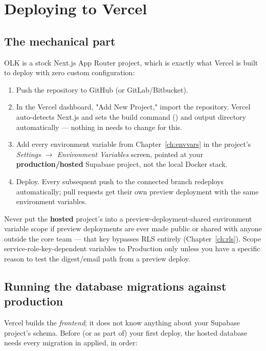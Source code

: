 \chapter{Deploying to Vercel}
\label{ch:vercel}

\section{The mechanical part}

OLK is a stock Next.js App Router project, which is exactly what Vercel is built to deploy with zero custom configuration:

\begin{enumerate}
  \item Push the repository to GitHub (or GitLab/Bitbucket).
  \item In the Vercel dashboard, "Add New Project," import the repository. Vercel auto-detects Next.js and sets the build command () and output directory automatically — nothing in  needs to change for this.
  \item Add every environment variable from Chapter~\ref{ch:envvars} in the project's \emph{Settings $\to$ Environment Variables} screen, pointed at your \textbf{production/hosted} Supabase project, not the local Docker stack.
  \item Deploy. Every subsequent push to the connected branch redeploys automatically; pull requests get their own preview deployment with the same environment variables.
\end{enumerate}

\begin{olkwarn}
Never put the \textbf{hosted} project's  into a preview-deployment-shared environment variable scope if preview deployments are ever made public or shared with anyone outside the core team — that key bypasses RLS entirely (Chapter~\ref{ch:rls}). Scope service-role-key-dependent variables to Production only unless you have a specific reason to test the digest/email path from a preview deploy.
\end{olkwarn}

\section{Running the database migrations against production}

Vercel builds the \emph{frontend}; it does not know anything about your Supabase project's schema. Before (or as part of) your first deploy, the hosted database needs every migration in  applied, in order:

